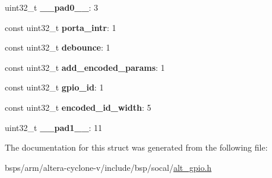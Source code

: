 \begin{DoxyCompactItemize}
uint32\+\_\+t {\bfseries \+\_\+\+\_\+pad0\+\_\+\+\_\+}\+: 3
\item 
\mbox{\label{structALT__GPIO__CFG__REG1__s_a53452b10b16fdef0d9bef055bd50bf9e}} 
const uint32\+\_\+t {\bfseries porta\+\_\+intr}\+: 1
\item 
\mbox{\label{structALT__GPIO__CFG__REG1__s_a869aaa0d8583abc3759d5924f95eb394}} 
const uint32\+\_\+t {\bfseries debounce}\+: 1
\item 
\mbox{\label{structALT__GPIO__CFG__REG1__s_a02d540dfec0b6fbeac587ade92a4df6f}} 
const uint32\+\_\+t {\bfseries add\+\_\+encoded\+\_\+params}\+: 1
\item 
\mbox{\label{structALT__GPIO__CFG__REG1__s_a3a0e09f4410a4e4a204c2af042f85597}} 
const uint32\+\_\+t {\bfseries gpio\+\_\+id}\+: 1
\item 
\mbox{\label{structALT__GPIO__CFG__REG1__s_a6a1ac6b7c648195666902c3027e67d6f}} 
const uint32\+\_\+t {\bfseries encoded\+\_\+id\+\_\+width}\+: 5
\item 
\mbox{\label{structALT__GPIO__CFG__REG1__s_ae94a9bfc1131450ffae99ed798b6e798}} 
uint32\+\_\+t {\bfseries \+\_\+\+\_\+pad1\+\_\+\+\_\+}\+: 11
\end{DoxyCompactItemize}


The documentation for this struct was generated from the following file\+:\begin{DoxyCompactItemize}
\item 
bsps/arm/altera-\/cyclone-\/v/include/bsp/socal/\mbox{\hyperlink{alt__gpio_8h}{alt\+\_\+gpio.\+h}}\end{DoxyCompactItemize}
